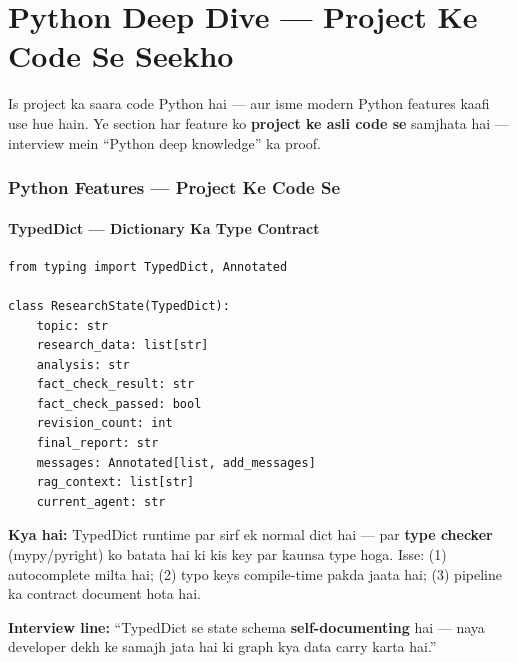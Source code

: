 \newpage

\part{Python Deep Dive --- Project Ke Code Se Seekho}

\begin{storybox}
Is project ka saara code Python hai --- aur isme modern Python features kaafi use hue hain. Ye section har feature ko \textbf{project ke asli code se} samjhata hai --- interview mein ``Python deep knowledge'' ka proof.
\end{storybox}

\section{Python Features --- Project Ke Code Se}

\subsection{TypedDict --- Dictionary Ka Type Contract}

\begin{codestorybox}
\begin{lstlisting}[style=pythonstyle, caption={state/schema.py se}]
from typing import TypedDict, Annotated

class ResearchState(TypedDict):
    topic: str
    research_data: list[str]
    analysis: str
    fact_check_result: str
    fact_check_passed: bool
    revision_count: int
    final_report: str
    messages: Annotated[list, add_messages]
    rag_context: list[str]
    current_agent: str
\end{lstlisting}

\textbf{Kya hai:} TypedDict runtime par sirf ek normal dict hai --- par \textbf{type checker} (mypy/pyright) ko batata hai ki kis key par kaunsa type hoga. Isse: (1) autocomplete milta hai; (2) typo keys compile-time pakda jaata hai; (3) pipeline ka contract document hota hai.

\textbf{Interview line:} ``TypedDict se state schema \textbf{self-documenting} hai --- naya developer dekh ke samajh jata hai ki graph kya data carry karta hai.''
\end{codestorybox}

